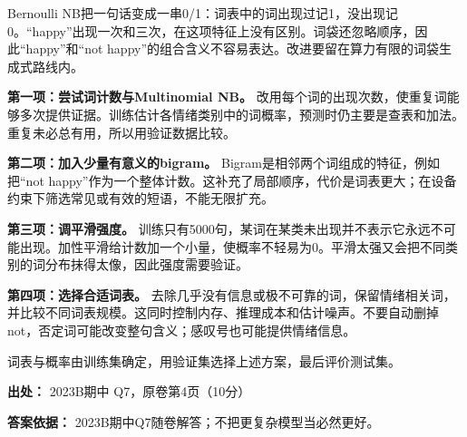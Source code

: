 Bernoulli NB把一句话变成一串0/1：词表中的词出现过记1，没出现记0。“happy”出现一次和三次，在这项特征上没有区别。词袋还忽略顺序，因此“happy”和“not happy”的组合含义不容易表达。改进要留在算力有限的词袋生成式路线内。


\textbf{第一项：尝试词计数与Multinomial NB。} 改用每个词的出现次数，使重复词能够多次提供证据。训练估计各情绪类别中的词概率，预测时仍主要是查表和加法。重复未必总有用，所以用验证数据比较。


\textbf{第二项：加入少量有意义的bigram。} Bigram是相邻两个词组成的特征，例如把“not happy”作为一个整体计数。这补充了局部顺序，代价是词表更大；在设备约束下筛选常见或有效的短语，不能无限扩充。


\textbf{第三项：调平滑强度。} 训练只有5000句，某词在某类未出现并不表示它永远不可能出现。加性平滑给计数加一个小量，使概率不轻易为0。平滑太强又会把不同类别的词分布抹得太像，因此强度需要验证。


\textbf{第四项：选择合适词表。} 去除几乎没有信息或极不可靠的词，保留情绪相关词，并比较不同词表规模。这同时控制内存、推理成本和估计噪声。不要自动删掉not，否定词可能改变整句含义；感叹号也可能提供情绪信息。


词表与概率由训练集确定，用验证集选择上述方案，最后评价测试集。


\textbf{出处：} 2023B期中 Q7，原卷第4页（10分）


\textbf{答案依据：} 2023B期中Q7随卷解答；不把更复杂模型当必然更好。
